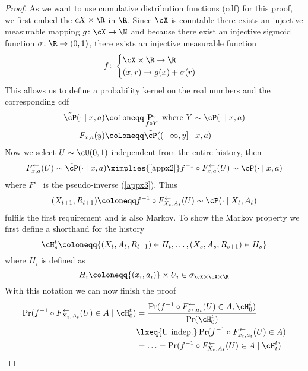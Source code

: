 \begin{proof}
	As we want to use cumulative distribution functions (cdf) for this proof, we first embed the \(cX\times\R\) in \(\R\). Since \(\cX\) is countable there exists an injective measurable mapping \(g\colon \cX\to\N\)
	and because there exist an injective sigmoid function \(\sigma\colon \R\to(0,1)\), there exists an injective measurable function
	\begin{align*}
		f\colon
		\begin{cases}
			\cX\times\R \to \R \\
			(x,r)\to g(x)+\sigma(r)
		\end{cases}
	\end{align*}
	This allows us to define a probability kernel on the real numbers and the corresponding cdf
	\begin{align*}
		\tilde{\cP}(\cdot\mid x,a)&\coloneqq \Pr_{f\circ Y} \text{ where } Y\sim \cP(\cdot\mid x,a)\\
		F_{x,a}(y)&\coloneqq \tilde{\cP}( (-\infty,y]\mid x,a)
	\end{align*}
	Now we select \(U\sim \cU(0,1)\) independent from the entire history, then 
	\begin{align*}
		F^\leftarrow_{x,a}(U) \sim \tilde{\cP}(\cdot\mid x,a) 
		\ximplies{\text{\ref{appx2}}} f^{-1}\circ F^\leftarrow_{x,a}(U)\sim \cP(\cdot \mid x,a)
	\end{align*}
	where \(F^\leftarrow\) is the pseudo-inverse (\ref{appx3}).	Thus 
	\[
		(X_{t+1},R_{t+1})\coloneqq f^{-1}\circ 
		F^\leftarrow_{X_t, A_t}(U) \sim \cP(\cdot \mid X_t, A_t)
	\]
	fulfils the first requirement and is also Markov. To show the Markov property we first define a shorthand for the history
	\[
		\cH_s^t\coloneqq \{(X_t,A_t,R_{t+1})\in H_t,\dots,(X_s,A_s,R_{s+1})\in H_s \}
	\]
	where \(H_i\) is defined as
	\[
		H_i\coloneqq\{(x_i,a_i)\}\times U_i \in \sigma_{\cX\times\cA\times\R}
	\]
	With this notation we can now finish the proof
	\begin{align*}
		\Pr(f^{-1}\circ F^\leftarrow_{X_t, A_t}(U) \in A \mid \cH_0^t)
		&=\frac{\Pr(f^{-1}\circ F^\leftarrow_{x_t, a_t}(U) \in A, \cH_0^t)}{
			\Pr(\cH_0^t)}\\
		&\lxeq{\text{U indep.}}\Pr(f^{-1}\circ F^\leftarrow_{x_t, a_t}(U) \in A)\\
		&=\dotsc = \Pr(f^{-1}\circ F^\leftarrow_{X_t, A_t}(U) \in A \mid \cH_t^t)\qedhere
	\end{align*}
\end{proof}

